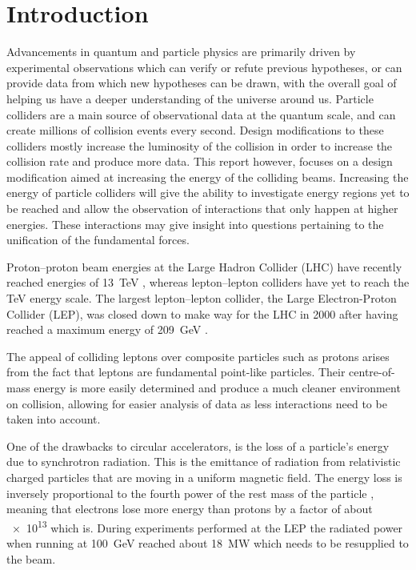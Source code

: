 
\section{Introduction}

Advancements in quantum and particle physics are primarily driven by
experimental observations which can verify or refute previous hypotheses, or can
provide data from which new hypotheses can be drawn, with the overall goal
of helping us have a deeper understanding of the universe around us.
Particle colliders are a main source of observational data at the quantum scale,
and can create millions of collision events every second.  Design modifications
to these colliders mostly increase the luminosity of the collision in order to
increase the collision rate and produce more data.  This report however, focuses
on a design modification aimed at increasing the energy of the colliding beams.
Increasing the energy of particle colliders will give the ability to investigate
energy regions yet to be reached and allow the observation of interactions that
only happen at higher energies. These interactions may give insight into
questions pertaining to the unification of the fundamental forces.

Proton--proton beam energies at the Large Hadron Collider (LHC) have recently
reached energies of \SI{13}{\tera\electronvolt} \cite{CMS:2015bta}, whereas
lepton--lepton colliders have yet to reach the \si{\tera\electronvolt} energy
scale. The largest lepton--lepton collider, the Large Electron-Proton Collider
(LEP), was closed down to make way for the LHC in \num{2000} after having
reached a maximum energy of \SI{209}{\giga\electronvolt} \cite{Barate2003sz}.

The appeal of colliding leptons over composite particles such as protons arises
from the fact that leptons are fundamental point-like particles. Their
centre-of-mass energy is more easily determined and produce a much cleaner
environment on collision, allowing for easier analysis of data as less
interactions need to be taken into account.

One of the drawbacks to circular accelerators,
is the loss of a particle's energy due to synchrotron radiation.  This is the
emittance of radiation from relativistic charged particles that are moving in a
uniform magnetic field. The energy loss is inversely proportional to the fourth
power of the rest mass of the particle \cite{sokolov1966synchrotron}, meaning
that electrons lose more energy than protons by a factor of about \num{e13}
which is.  During experiments performed at the LEP the radiated power when
running at \SI{100}{\giga\electronvolt} reached about \SI{18}{\mega\watt} which
needs to be resupplied to the beam.

